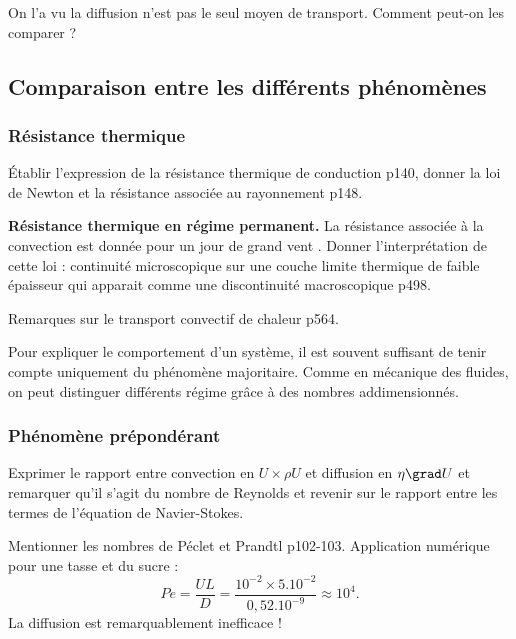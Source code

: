 \begin{transition}
On l'a vu la diffusion n'est pas le seul moyen de transport.
Comment peut-on les comparer ?
\end{transition}

\subsection{Comparaison entre les différents phénomènes}

\subsubsection{Résistance thermique}

Établir l'expression de la résistance thermique de conduction \cite{Sanz2016} p140, donner la loi de Newton et la résistance associée au rayonnement p148.

\begin{slide}
\textbf{Résistance thermique en régime permanent.}
La résistance associée à la convection est donnée pour un \og jour de grand vent \fg{}.
Donner l'interprétation de cette loi : continuité microscopique sur une couche limite thermique de faible épaisseur qui apparait comme une discontinuité macroscopique \cite{Diu2008} p498.
\end{slide}

\begin{remarque}
Remarques sur le transport convectif de chaleur \cite{Guyon2001} p564.
\end{remarque}

\begin{transition}
Pour expliquer le comportement d'un système, il est souvent suffisant de tenir compte uniquement du phénomène majoritaire.
Comme en mécanique des fluides, on peut distinguer différents régime grâce à des nombres addimensionnés.
\end{transition}

\subsubsection{Phénomène prépondérant}

Exprimer le rapport entre convection en $U \times \rho U$ et diffusion en $\eta \grad U$ et remarquer qu'il s'agit du nombre de Reynolds et revenir sur le rapport entre les termes de l'équation de Navier-Stokes.

Mentionner les nombres de Péclet et Prandtl \cite{Guyon2001} p102-103.
Application numérique pour une tasse et du sucre :
\begin{equation}
Pe = \frac{UL}{D} = \frac{10^{-2}\times 5.10^{-2}}{0,52.10^{-9}} \approx 10^4.
\end{equation}
La diffusion est remarquablement inefficace !

